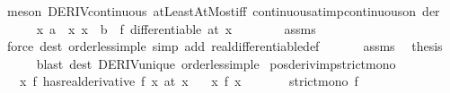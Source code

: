 \begin{isabellebody}
\ {\isacharparenleft}{\kern0pt}meson\ DERIV{\isacharunderscore}{\kern0pt}continuous\ atLeastAtMost{\isacharunderscore}{\kern0pt}iff\ continuous{\isacharunderscore}{\kern0pt}at{\isacharunderscore}{\kern0pt}imp{\isacharunderscore}{\kern0pt}continuous{\isacharunderscore}{\kern0pt}on\ der{\isacharparenright}{\kern0pt}\ \isanewline
\ \ \ \ \isamarkupfalse%
\ {\isachardoublequoteopen}{\isasymAnd}x{\isachardot}{\kern0pt}\ {\isasymlbrakk}a\ {\isacharless}{\kern0pt}\ x{\isacharsemicolon}{\kern0pt}\ x\ {\isacharless}{\kern0pt}\ b{\isasymrbrakk}\ {\isasymLongrightarrow}\ f\ differentiable\ {\isacharparenleft}{\kern0pt}at\ x{\isacharparenright}{\kern0pt}{\isachardoublequoteclose}\isanewline
\ \ \ \ \ \ \isamarkupfalse%
\ assms\ \isamarkupfalse%
\ {\isacharparenleft}{\kern0pt}force\ dest{\isacharcolon}{\kern0pt}\ order{\isacharunderscore}{\kern0pt}less{\isacharunderscore}{\kern0pt}imp{\isacharunderscore}{\kern0pt}le\ simp\ add{\isacharcolon}{\kern0pt}\ real{\isacharunderscore}{\kern0pt}differentiable{\isacharunderscore}{\kern0pt}def{\isacharparenright}{\kern0pt}\isanewline
\ \ \isamarkupfalse%
\isanewline
\ \ \isamarkupfalse%
\ assms\ \isamarkupfalse%
\ {\isacharquery}{\kern0pt}thesis\isanewline
\ \ \ \ \isamarkupfalse%
\ {\isacharparenleft}{\kern0pt}blast\ dest{\isacharcolon}{\kern0pt}\ DERIV{\isacharunderscore}{\kern0pt}unique\ order{\isacharunderscore}{\kern0pt}less{\isacharunderscore}{\kern0pt}imp{\isacharunderscore}{\kern0pt}le{\isacharparenright}{\kern0pt}\isanewline
{}\isamarkupfalse%
%
\endisatagproof
{\isafoldproof}%
%
\isadelimproof
\isanewline
%
\endisadelimproof
\isanewline
{}\isamarkupfalse%
\ pos{\isacharunderscore}{\kern0pt}deriv{\isacharunderscore}{\kern0pt}imp{\isacharunderscore}{\kern0pt}strict{\isacharunderscore}{\kern0pt}mono{\isacharcolon}{\kern0pt}\isanewline
\ \ \ {\isachardoublequoteopen}{\isasymAnd}x{\isachardot}{\kern0pt}\ {\isacharparenleft}{\kern0pt}f\ has{\isacharunderscore}{\kern0pt}real{\isacharunderscore}{\kern0pt}derivative\ f{\isacharprime}{\kern0pt}\ x{\isacharparenright}{\kern0pt}\ {\isacharparenleft}{\kern0pt}at\ x{\isacharparenright}{\kern0pt}{\isachardoublequoteclose}\isanewline
\ \ \ {\isachardoublequoteopen}{\isasymAnd}x{\isachardot}{\kern0pt}\ f{\isacharprime}{\kern0pt}\ x\ {\isachargreater}{\kern0pt}\ {}{\isachardoublequoteclose}\isanewline
\ \ \ \ \ {\isachardoublequoteopen}strict{\isacharunderscore}{\kern0pt}mono\ f{\isachardoublequoteclose}\isanewline

\end{isabellebody}
